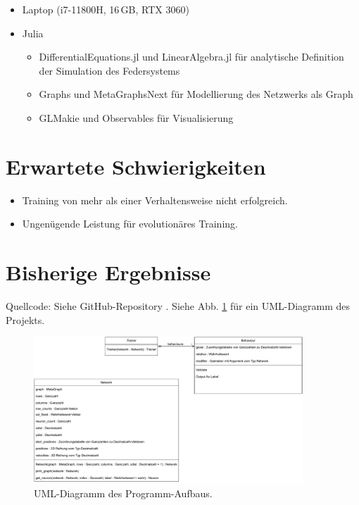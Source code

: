 \documentclass[parskip]{scrartcl}
\begin{document}
\begin{itemize}
    \item Laptop (i7-11800H, 16\,GB, RTX 3060)
    \item Julia
    \begin{itemize}
        \item DifferentialEquations.jl und LinearAlgebra.jl für analytische Definition der Simulation des Federsystems
        \item Graphs und MetaGraphsNext für Modellierung des Netzwerks als Graph
        \item GLMakie und Observables für Visualisierung
    \end{itemize}
\end{itemize}

\section{Erwartete Schwierigkeiten}

\begin{itemize}
    \item Training von mehr als einer Verhaltensweise nicht erfolgreich.
    \item Ungenügende Leistung für evolutionäres Training.
\end{itemize}

\section{Bisherige Ergebnisse}

Quellcode: Siehe GitHub-Repository \cite{RepoMNN}.
Siehe Abb. \ref{fig:uml} für ein UML-Diagramm des Projekts.

\begin{figure}
    \centering
    \includegraphics[width=0.9\textwidth]{bilder/uml.pdf}
    \caption{UML-Diagramm des Programm-Aufbaus.}
    \label{fig:uml}
\end{figure}
\end{document}
